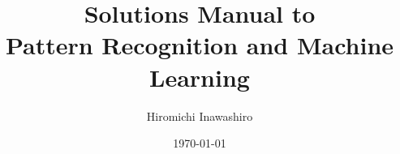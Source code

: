 \documentclass[12pt]{article}
\title{Solutions Manual to \protect\\ Pattern Recognition and Machine Learning}
\author{Hiromichi Inawashiro}
\date{\today}
\numberwithin{equation}{section}
\begin{document}
\maketitle{}

\newpage{}

\tableofcontents

\newpage{}


\end{document}
